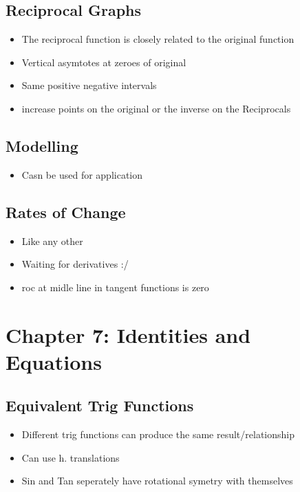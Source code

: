 \documentclass{article}
\begin{document}
    \subsection{Reciprocal Graphs}
    \begin{itemize}
        \item The reciprocal function is closely related to the original function
        \item Vertical asymtotes at zeroes of original
        \item Same positive negative intervals
        \item increase points on the original or the inverse on the Reciprocals
    \end{itemize}

    \subsection{Modelling}
    \begin{itemize}
        \item Casn be used for application
    \end{itemize}

    \subsection{Rates of Change}
    \begin{itemize}
        \item Like any other
        \item Waiting for derivatives :/
        \item roc at midle line in tangent functions is zero
    \end{itemize}

    \section{Chapter 7: Identities and Equations}

    \subsection{Equivalent Trig Functions}
    \begin{itemize}
        \item Different trig functions can produce the same result/relationship
        \item Can use h. translations
        \item Sin and Tan seperately have rotational symetry with themselves
    \end{itemize}
\end{document}
